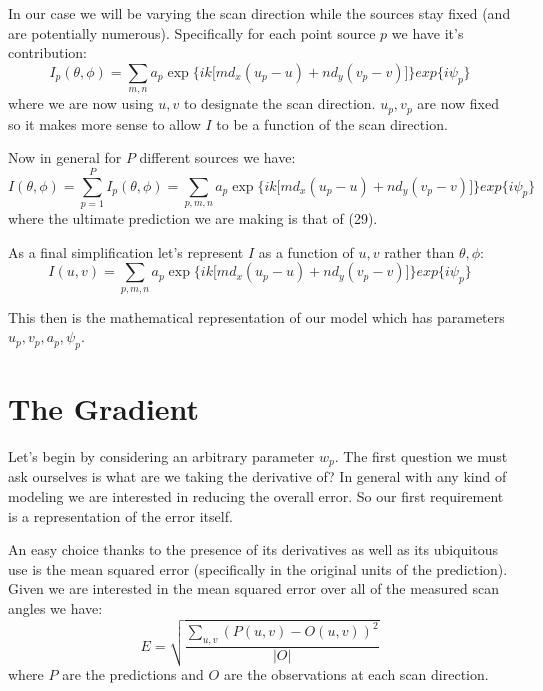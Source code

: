 \documentclass[10pt,a5paper]{book}
\begin{document}
In our case we will be varying the scan direction while the sources stay fixed (and are potentially numerous). Specifically for each point source $p$ we have it's contribution:
\begin{equation}
I_p(\theta, \phi) = \sum_{m,n}a_p\exp\lbrace ik \lbrack md_x(u_p-u)+nd_y(v_p-v)\rbrack\rbrace exp\lbrace i\psi_p \rbrace
\end{equation}
where we are now using $u,v$ to designate the scan direction. $u_p, v_p$ are now fixed so it makes more sense to allow $I$ to be a function of the scan direction. 

Now in general for $P$ different sources we have:
\begin{equation}
I(\theta, \phi) = \sum_{p=1}^{P} I_p(\theta, \phi)= \sum_{p,m,n}a_p\exp\lbrace ik \lbrack md_x(u_p-u)+nd_y(v_p-v)\rbrack\rbrace exp\lbrace i\psi_p \rbrace
\end{equation}
where the ultimate prediction we are making is that of (29).

As a final simplification let's represent $I$ as a function of $u,v$ rather than $\theta, \phi$:
\begin{equation}
I(u, v) = \sum_{p,m,n}a_p\exp\lbrace ik \lbrack md_x(u_p-u)+nd_y(v_p-v)\rbrack\rbrace exp\lbrace i\psi_p \rbrace
\end{equation}

This then is the mathematical representation of our model which has parameters $u_p,v_p,a_p,\psi_p$.

\section{The Gradient}
Let's begin by considering an arbitrary parameter $w_p$. The first question we must ask ourselves is what are we taking the derivative of? In general with any kind of modeling we are interested in reducing the overall error. So our first requirement is a representation of the error itself.

An easy choice thanks to the presence of its derivatives as well as its ubiquitous use is the mean squared error (specifically in the original units of the prediction). Given we are interested in the mean squared error over all of the measured scan angles we have:
\begin{equation}
E = \sqrt{\frac{\sum_{u,v}(P(u,v) - O(u,v))^2}{|O|}} 
\end{equation}
where $P$ are the predictions and $O$ are the observations at each scan direction.
\end{document}
